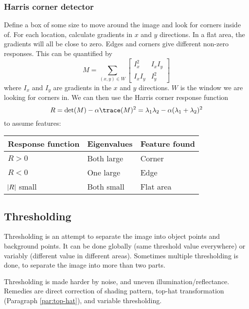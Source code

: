 \subsubsection{Harris corner detector}
Define a box of some size to move around the image and look for corners inside of. For each location, calculate gradients in $x$ and $y$ directions. In a flat area, the gradients will all be close to zero. Edges and corners give different non-zero responses. This can be quantified by
\begin{equation}
    M = \sum_{(x,y) \in W}
    \begin{bmatrix}
        I_x^2   & I_x I_y \\
        I_x I_y & I_y^2
    \end{bmatrix}
\end{equation}
where $I_x$ and $I_y$ are gradients in the $x$ and $y$ directions. $W$ is the window we are looking for corners in. We can then use the Harris corner response function
\begin{equation}
    R = \det(M) - \alpha \trace(M)^2 = \lambda_1 \lambda_2 - \alpha (\lambda_1 + \lambda_2)^2
\end{equation}
to assume features:
\begin{center}
\begin{tabular}{lll}
    Response function & Eigenvalues & Feature found \\
    \hline
    $R > 0$           & Both large  & Corner        \\
    $R < 0$           & One large   & Edge          \\
    $\abs{R}$ small   & Both small  & Flat area
\end{tabular}
\end{center}

\subsection{Thresholding}
Thresholding is an attempt to separate the image into object points and background points. It can be done globally (same threshold value everywhere) or variably (different value in different areas). Sometimes multiple thresholding is done, to separate the image into more than two parts.

Thresholding is made harder by noise, and uneven illumination/reflectance. Remedies are direct correction of shading pattern, top-hat transformation (Paragraph \ref{par:top-hat}), and variable thresholding.

